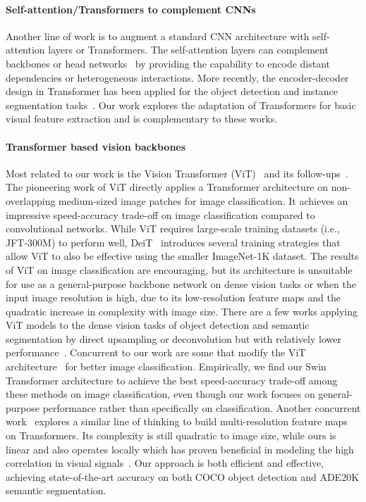 \documentclass[10pt,twocolumn,letterpaper]{article}
\begin{document}
\paragraph{Self-attention/Transformers to complement CNNs} Another line of work is to augment a standard CNN architecture with self-attention layers or Transformers. The self-attention layers can complement backbones \cite{wang2017non,cao2019gcnet,bello2020attention,yin2020DNL,fu2019danet,yuan2018ocnet,srinivas2021bottlenecktrans} or head networks~\cite{hu2018relation,gu2018learnregionfeat} by providing the capability to encode distant dependencies or heterogeneous interactions. More recently, the encoder-decoder design in Transformer has been applied for the object detection and instance segmentation tasks~\cite{carion2020detr,chi2020relationnet++,zhu2020deformabledetr,sun2020sparsercnn}. Our work explores the adaptation of Transformers for basic visual feature extraction and is complementary to these works.

\paragraph{Transformer based vision backbones} Most related to our work is the Vision Transformer (ViT)~\cite{dosovitskiy2020vit} and its follow-ups~\cite{touvron2020deit,yuan2021t2t,chu2021postrans,han2021tnt,wang2021pvt}. The pioneering work of ViT directly applies a Transformer architecture on non-overlapping medium-sized image patches for image classification. It achieves an impressive speed-accuracy trade-off on image classification compared to convolutional networks. While ViT requires large-scale training datasets (i.e., JFT-300M) to perform well, DeiT~\cite{touvron2020deit} introduces several training strategies that allow ViT to also be effective using the smaller ImageNet-1K dataset. The results of ViT on image classification are encouraging, but its architecture is unsuitable for use as a general-purpose backbone network on dense vision tasks or when the input image resolution is high, due to its low-resolution feature maps and the quadratic increase in complexity with image size. There are a few works applying ViT models to the dense vision tasks of object detection and semantic segmentation by direct upsampling or deconvolution but with relatively lower performance~\cite{beal2020toward,zheng2020SETR}. Concurrent to our work are some that modify the ViT architecture~\cite{yuan2021t2t,chu2021postrans,han2021tnt} for better image classification. Empirically, we find our Swin Transformer architecture to achieve the best speed-accuracy trade-off among these methods on image classification, even though our work focuses on general-purpose performance rather than specifically on classification. Another concurrent work~\cite{wang2021pvt} explores a similar line of thinking to build multi-resolution feature maps on Transformers. Its complexity is still quadratic to image size, while ours is linear and also operates locally which has proven beneficial in modeling the high correlation in visual signals~\cite{hubel1962receptive,fukushima1975cognitron,lecun1999object}. Our approach is both efficient and effective, achieving state-of-the-art accuracy on both COCO object detection and ADE20K semantic segmentation. 
\end{document}
